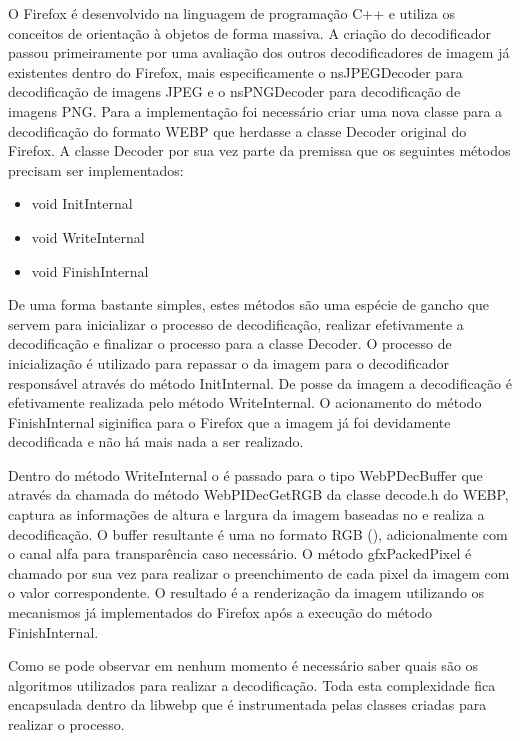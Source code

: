 \documentclass[espaco=simples,appendix=Name]{abnt}
\begin{document}
O Firefox é desenvolvido na linguagem de programação C++ e utiliza os conceitos de orientação à objetos de forma massiva. A criação do decodificador passou primeiramente por uma avaliação dos outros decodificadores de imagem já existentes dentro do Firefox, mais especificamente o nsJPEGDecoder para decodificação de imagens JPEG e o nsPNGDecoder para decodificação de imagens PNG. Para a implementação foi necessário criar uma nova classe para a decodificação do formato WEBP que herdasse a classe Decoder original do Firefox. A classe Decoder por sua vez parte da premissa que os seguintes métodos precisam ser implementados:

\begin{itemize}
        \item void InitInternal
        \item void WriteInternal
        \item void FinishInternal
\end{itemize}

De uma forma bastante simples, estes métodos são uma espécie de gancho que servem para inicializar o processo de decodificação, realizar efetivamente a decodificação e finalizar o processo para a classe Decoder. O processo de inicialização é utilizado para repassar o  da imagem para o decodificador responsável através do método InitInternal. De posse da imagem a decodificação é efetivamente realizada pelo método WriteInternal. O acionamento do método FinishInternal siginifica para o Firefox que a imagem já foi devidamente decodificada e não há mais nada a ser realizado.

Dentro do método WriteInternal o  é passado para o tipo WebPDecBuffer que através da chamada do método WebPIDecGetRGB da classe decode.h do WEBP, captura as informações de altura e largura da imagem baseadas no  e realiza a decodificação. O buffer resultante é uma  no formato RGB (), adicionalmente com o canal alfa para transparência caso necessário. O método gfxPackedPixel é chamado por sua vez para realizar o preenchimento de cada pixel da imagem com o valor correspondente. O resultado é a renderização da imagem utilizando os mecanismos já implementados do Firefox após a execução do método FinishInternal.

Como se pode observar em nenhum momento é necessário saber quais são os algoritmos utilizados para realizar a decodificação. Toda esta complexidade fica encapsulada dentro da libwebp que é instrumentada pelas classes criadas para realizar o processo.
\end{document}
